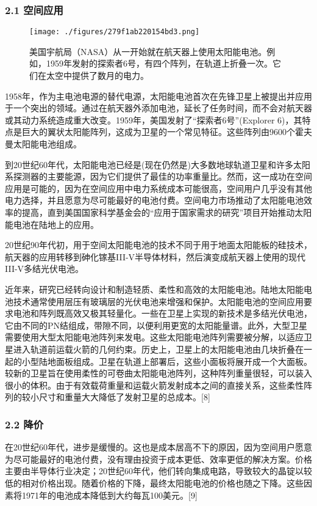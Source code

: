 \subsubsection{2.1 空间应用}

\begin{figure}[ht]
\centering
\texttt{[image: ./figures/279f1ab220154bd3.png]}
\caption{美国宇航局（NASA）从一开始就在航天器上使用太阳能电池。例如，1959年发射的探索者6号，有四个阵列，在轨道上折叠一次。它们在太空中提供了数月的电力。} \label{fig_TYNDC_16}
\end{figure}

1958年，作为主电池电源的替代电源，太阳能电池首次在先锋卫星上被提出并应用于一个突出的领域。通过在航天器外添加电池，延长了任务时间，而不会对航天器或其动力系统造成重大改变。1959年，美国发射了“探索者6号”(Explorer 6)，其特点是巨大的翼状太阳能阵列，这成为卫星的一个常见特征。这些阵列由9600个霍夫曼太阳能电池组成。

到20世纪60年代，太阳能电池已经是(现在仍然是)大多数地球轨道卫星和许多太阳系探测器的主要能源，因为它们提供了最佳的功率重量比。然而，这一成功在空间应用是可能的，因为在空间应用中电力系统成本可能很高，空间用户几乎没有其他电力选择，并且愿意为尽可能最好的电池付费。空间电力市场推动了太阳能电池效率的提高，直到美国国家科学基金会的“应用于国家需求的研究”项目开始推动太阳能电池在陆地上的应用。

20世纪90年代初，用于空间太阳能电池的技术不同于用于地面太阳能板的硅技术，航天器的应用转移到砷化镓基III-V半导体材料，然后演变成航天器上使用的现代III-V多结光伏电池。

近年来，研究已经转向设计和制造轻质、柔性和高效的太阳能电池。陆地太阳能电池技术通常使用层压有玻璃层的光伏电池来增强和保护。太阳能电池的空间应用要求电池和阵列既高效又极其轻量化。一些在卫星上实现的新技术是多结光伏电池，它由不同的PN结组成，带隙不同，以便利用更宽的太阳能量谱。此外，大型卫星需要使用大型太阳能电池阵列来发电。这些太阳能电池阵列需要被分解，以适应卫星进入轨道前运载火箭的几何约束。历史上，卫星上的太阳能电池由几块折叠在一起的小型陆地面板组成。卫星在轨道上部署后，这些小面板将展开成一个大面板。较新的卫星旨在使用柔性的可卷曲太阳能电池阵列，这种阵列重量很轻，可以装入很小的体积。由于有效载荷重量和运载火箭发射成本之间的直接关系，这些柔性阵列的较小尺寸和重量大大降低了发射卫星的总成本。[8]

\subsubsection{2.2 降价}

在20世纪60年代，进步是缓慢的。这也是成本居高不下的原因，因为空间用户愿意为尽可能最好的电池付费，没有理由投资于成本更低、效率更低的解决方案。价格主要由半导体行业决定；20世纪60年代，他们转向集成电路，导致较大的晶锭以较低的相对价格出现。随着价格的下降，最终太阳能电池的价格也随之下降。这些因素将1971年的电池成本降低到大约每瓦100美元。[9]

